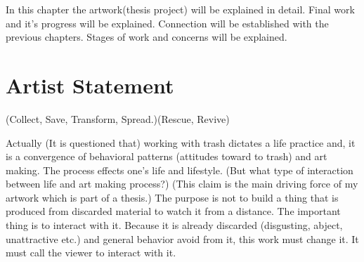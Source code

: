 In this chapter the artwork(thesis project) will be explained in detail. Final work and it's progress will be explained. Connection will be established with the previous chapters. Stages of work and concerns will be explained. 





\section{Artist Statement}
(Collect, Save, Transform, Spread.)(Rescue, Revive)





Actually (It is questioned that) working with trash dictates a life practice and, it is a convergence of behavioral patterns (attitudes toward to trash) and art making. The process effects one's life and lifestyle. (But what type of interaction between life and art making process?) (This claim is the main driving force of my artwork which is part of a thesis.) The purpose is not to build a thing that is produced from discarded material to watch it from a distance. The important thing is to interact with it. Because it is already discarded (disgusting, abject, unattractive etc.) and general behavior avoid from it, this work must change it. It must call the viewer to interact with it.

